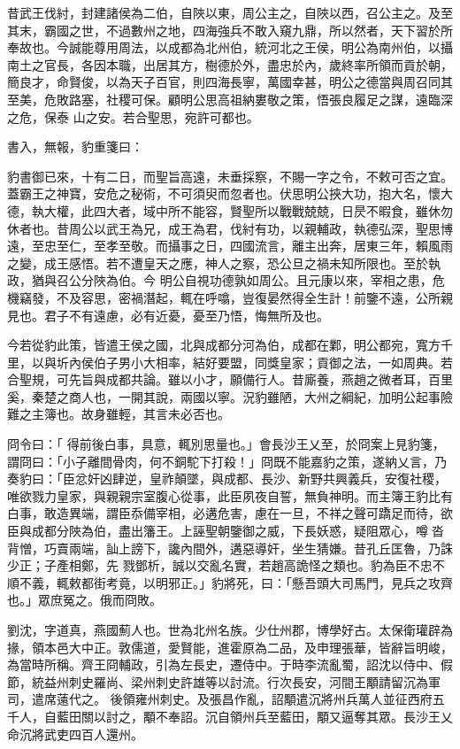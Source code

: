 \begin{pinyinscope}
 昔武王伐紂，封建諸侯為二伯，自陜以東，周公主之，自陜以西，召公主之。及至其末，霸國之世，不過數州之地，四海強兵不敢入窺九鼎，所以然者，天下習於所奉故也。今誠能尊用周法，以成都為北州伯，統河北之王侯，明公為南州伯，以攝南土之官長，各因本職，出居其方，樹德於外，盡忠於內，歲終率所領而貢於朝，簡良才，命賢俊，以為天子百官，則四海長寧，萬國幸甚，明公之德當與周召同其至美，危敗路塞，社稷可保。顧明公思高祖納婁敬之策，悟張良履足之謀，遠臨深之危，保泰
 山之安。若合聖思，宛許可都也。



 書入，無報，豹重箋曰：



 豹書御已來，十有二日，而聖旨高遠，未垂採察，不賜一字之令，不敕可否之宜。蓋霸王之神寶，安危之秘術，不可須臾而忽者也。伏思明公挾大功，抱大名，懷大德，執大權，此四大者，域中所不能容，賢聖所以戰戰兢兢，日昃不暇食，雖休勿休者也。昔周公以武王為兄，成王為君，伐紂有功，以親輔政，執德弘深，聖思博遠，至忠至仁，至孝至敬。而攝事之日，四國流言，離主出奔，居東三年，賴風雨之變，成王感悟。若不遭皇天之應，神人之察，恐公旦之禍未知所限也。至於執政，猶與召公分陜為伯。今
 明公自視功德孰如周公。且元康以來，宰相之患，危機竊發，不及容思，密禍潛起，輒在呼噏，豈復晏然得全生計！前鑒不遠，公所親見也。君子不有遠慮，必有近憂，憂至乃悟，悔無所及也。



 今若從豹此策，皆遣王侯之國，北與成都分河為伯，成都在鄴，明公都宛，寬方千里，以與圻內侯伯子男小大相率，結好要盟，同獎皇家；貢御之法，一如周典。若合聖規，可先旨與成都共論。雖以小才，願備行人。昔廝養，燕趙之微者耳，百里奚，秦楚之商人也，一開其說，兩國以寧。況豹雖陋，大州之綱紀，加明公起事險難之主簿也。故身雖輕，其言未必否也。



 冏令曰：「
 得前後白事，具意，輒別思量也。」會長沙王乂至，於冏案上見豹箋，謂冏曰：「小子離間骨肉，何不銅駝下打殺！」冏既不能嘉豹之策，遂納乂言，乃奏豹曰：「臣忿奸凶肆逆，皇祚顛墜，與成都、長沙、新野共興義兵，安復社稷，唯欲戮力皇家，與親親宗室腹心從事，此臣夙夜自誓，無負神明。而主簿王豹比有白事，敢造異端，謂臣忝備宰相，必遘危害，慮在一旦，不祥之聲可蹻足而待，欲臣與成都分陜為伯，盡出籓王。上誣聖朝鑒御之威，下長妖惑，疑阻眾心，噂沓背憎，巧賣兩端，訕上謗下，讒內間外，遘惡導奸，坐生猜嫌。昔孔丘匡魯，乃誅少正；子產相鄭，先
 戮鄧析，誠以交亂名實，若趙高詭怪之類也。豹為臣不忠不順不義，輒敕都街考竟，以明邪正。」豹將死，曰：「懸吾頭大司馬門，見兵之攻齊也。」眾庶冤之。俄而冏敗。



 劉沈，字道真，燕國薊人也。世為北州名族。少仕州郡，博學好古。太保衛瓘辟為掾，領本邑大中正。敦儒道，愛賢能，進霍原為二品，及申理張華，皆辭旨明峻，為當時所稱。齊王冏輔政，引為左長史，遷侍中。于時李流亂蜀，詔沈以侍中、假節，統益州刺史羅尚、梁州刺史許雄等以討流。行次長安，河間王顒請留沉為軍司，遣席薳代之。
 後領雍州刺史。及張昌作亂，詔顒遣沉將州兵萬人並征西府五千人，自藍田關以討之，顒不奉詔。沉自領州兵至藍田，顒又逼奪其眾。長沙王乂命沉將武吏四百人還州。




\end{pinyinscope}
